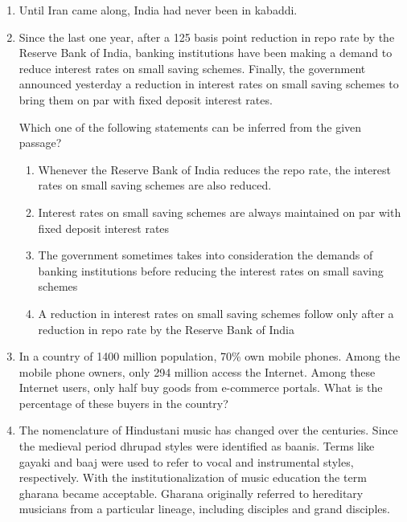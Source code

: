 \documentclass[journal]{IEEEtran}
\begin{document}
\begin{enumerate}
\begin{enumerate}
\end{enumerate}
\item Until Iran came along, India had never been \underline{\hspace{1cm}} in kabaddi.
\begin{enumerate}
\end{enumerate}
\item Since the last one year, after a 125 basis point reduction in repo rate by the Reserve Bank
of India, banking institutions have been making a demand to reduce interest rates on small 
saving schemes. Finally, the government announced yesterday a reduction in interest rates 
on small saving schemes to bring them on par with fixed deposit interest rates.


Which one of the following statements can be inferred from the given passage?
\begin{enumerate}
\item Whenever the Reserve Bank of India reduces the repo rate, the interest rates on small 
saving schemes are also reduced.
\item Interest rates on small saving schemes are always maintained on par with fixed deposit 
interest rates
\item The government sometimes takes into consideration the demands of banking 
institutions before reducing the interest rates on small saving schemes
\item A reduction in interest rates on small saving schemes follow only after a reduction in 
repo rate by the Reserve Bank of India
\end{enumerate}
\item In a country of 1400 million population, 70\% own mobile phones. Among the mobile phone owners, only 294 million access the Internet. Among these Internet users, only half buy goods from e-commerce portals. What is the percentage of these buyers in the country?
\begin{enumerate}
\end{enumerate}
\item The nomenclature of Hindustani music has changed over the centuries. Since the medieval period dhrupad styles were identified as baanis. Terms like gayaki and baaj were used to refer to vocal and instrumental styles, respectively. With the institutionalization of music education the term gharana became acceptable. Gharana originally referred to hereditary 
musicians from a particular lineage, including disciples and grand disciples.


\end{enumerate}
\end{document}
